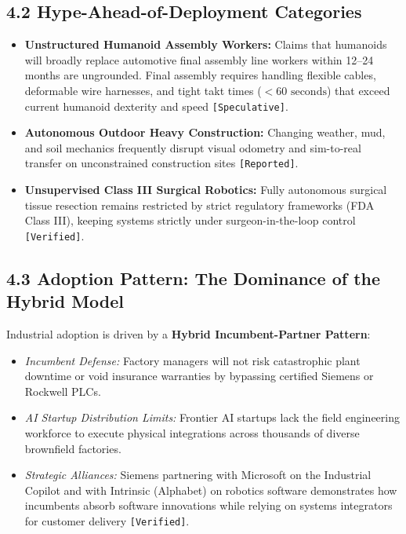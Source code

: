 \documentclass[11pt,a4paper]{article}
\begin{document}
\subsection{4.2 Hype-Ahead-of-Deployment Categories}
\begin{itemize}
    \item \textbf{Unstructured Humanoid Assembly Workers:} Claims that humanoids will broadly replace automotive final assembly line workers within 12--24 months are ungrounded. Final assembly requires handling flexible cables, deformable wire harnesses, and tight takt times ($<60\text{ seconds}$) that exceed current humanoid dexterity and speed \texttt{[Speculative]}.
    \item \textbf{Autonomous Outdoor Heavy Construction:} Changing weather, mud, and soil mechanics frequently disrupt visual odometry and sim-to-real transfer on unconstrained construction sites \texttt{[Reported]}.
    \item \textbf{Unsupervised Class III Surgical Robotics:} Fully autonomous surgical tissue resection remains restricted by strict regulatory frameworks (FDA Class III), keeping systems strictly under surgeon-in-the-loop control \texttt{[Verified]}.
\end{itemize}

\subsection{4.3 Adoption Pattern: The Dominance of the Hybrid Model}
Industrial adoption is driven by a \textbf{Hybrid Incumbent-Partner Pattern}:
\begin{itemize}
    \item \textit{Incumbent Defense:} Factory managers will not risk catastrophic plant downtime or void insurance warranties by bypassing certified Siemens or Rockwell PLCs.
    \item \textit{AI Startup Distribution Limits:} Frontier AI startups lack the field engineering workforce to execute physical integrations across thousands of diverse brownfield factories.
    \item \textit{Strategic Alliances:} Siemens partnering with Microsoft on the Industrial Copilot and with Intrinsic (Alphabet) on robotics software demonstrates how incumbents absorb software innovations while relying on systems integrators for customer delivery \texttt{[Verified]}.
\end{itemize}

\end{document}
